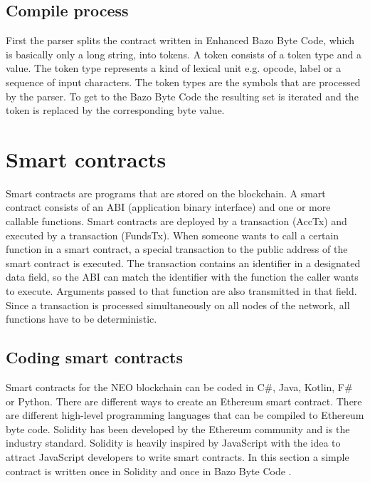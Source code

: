 \subsection{Compile process}
First the parser splits the contract written in \flqq Enhanced Bazo Byte Code\frqq{}, which is basically only a long string, into tokens. A token consists of a token type and a value. The token type represents a kind of lexical unit e.g. opcode, label or a sequence of input characters. The token types are the symbols that are processed by the parser. \cite{aho_compilers:_2007} To get to the \flqq Bazo Byte Code\frqq{} the resulting set is iterated and the token is replaced by the corresponding byte value.

\section{Smart contracts}
Smart contracts are programs that are stored on the blockchain. A smart contract consists of an ABI (application binary interface) and one or more callable functions. Smart contracts are deployed by a transaction (AccTx) and executed by a transaction  (FundsTx). When someone wants to call a certain function in a smart contract, a special transaction to the public address of the smart contract is executed. The transaction contains an identifier in a designated data field, so the ABI can match the identifier with the function the caller wants to execute. Arguments passed to that function are also transmitted in that field. Since a transaction is processed simultaneously on all nodes of the network, all functions have to be deterministic.

\subsection{Coding smart contracts}
Smart contracts for the NEO blockchain can be coded in C\#, Java, Kotlin, F\# or Python. There are different ways to create an Ethereum smart contract. There are different high-level programming languages that can be compiled to Ethereum byte code. Solidity has been developed by the Ethereum community and is the industry standard. Solidity is heavily inspired by JavaScript with the idea to attract JavaScript developers to write smart contracts. In this section a simple contract is written once in Solidity and once in \flqq Bazo Byte Code \frqq.

